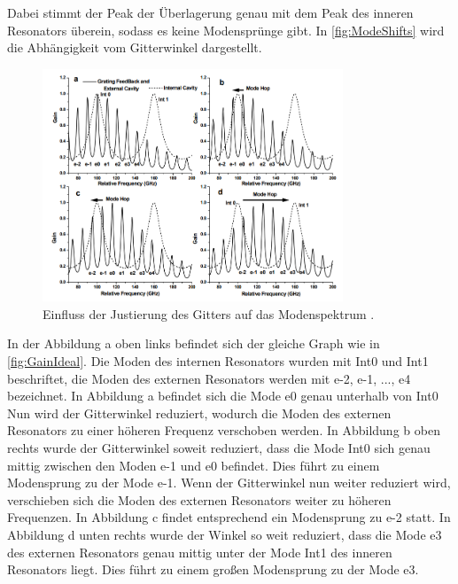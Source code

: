 Dabei stimmt der Peak der Überlagerung genau mit dem Peak des inneren Resonators überein, sodass es keine Modensprünge gibt.
In \autoref{fig:ModeShifts} wird die Abhängigkeit vom Gitterwinkel dargestellt.
\begin{figure}
    \centering
    \includegraphics[width=0.8\textwidth]{ModeShifts.png}
    \caption{Einfluss der Justierung des Gitters auf das Modenspektrum \cite{ap60}.}
    \label{fig:ModeShifts}
\end{figure}
In der Abbildung a oben links befindet sich der gleiche Graph wie in \autoref{fig:GainIdeal}.
Die Moden des internen Resonators wurden mit Int0 und Int1 beschriftet, die Moden des externen Resonators werden mit e-2, e-1, ..., e4
bezeichnet. In Abbildung a befindet sich die Mode e0 genau unterhalb von Int0
Nun wird der Gitterwinkel reduziert, wodurch die Moden des externen Resonators zu einer höheren Frequenz verschoben werden. 
In Abbildung b oben rechts wurde der Gitterwinkel soweit reduziert, dass die Mode Int0 sich genau mittig zwischen den Moden e-1 und e0 befindet. 
Dies führt zu einem Modensprung zu der Mode e-1. Wenn der Gitterwinkel nun weiter reduziert wird, verschieben sich die Moden des externen Resonators weiter zu 
höheren Frequenzen. In Abbildung c findet entsprechend ein Modensprung zu e-2 statt. In Abbildung d unten rechts wurde der Winkel 
so weit reduziert, dass die Mode e3 des externen Resonators genau mittig unter der Mode Int1 des inneren Resonators liegt. Dies führt 
zu einem großen Modensprung zu der Mode e3.

